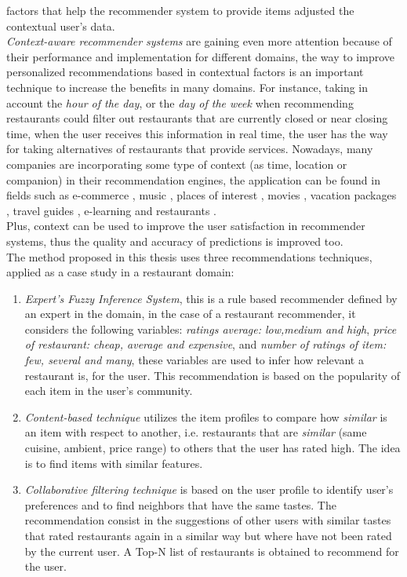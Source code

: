 factors that help the recommender system to provide items adjusted the
contextual user's data.\\
\textit{Context-aware recommender systems} are gaining even more
attention because of their performance and implementation for
different domains, the  way to improve personalized recommendations
based in contextual factors is an important technique to increase the
benefits in  many domains. For instance, taking in account the
\textit{hour of the day},  or the \textit{day of the week} when
recommending restaurants could  filter out restaurants that are
currently closed or near closing time, when the user receives this
information in real time, the user has the  way for taking
alternatives of restaurants that provide services. Nowadays, many
companies are incorporating some type of context (as time, location or
companion) in their recommendation engines, the application can be
found in fields such as e-commerce \cite{schafer1999recommender}
 \cite{bulander2005enabling}, music \cite{ricci2012context}
 \cite{baltrunas2011incarmusic}  \cite{huq2010automated}, places of
interest \cite{baltrunas2012context},
movies \cite{eyjolfsdottir2010moviegen}, vacation
packages \cite{liu2011personalized}  \cite{liu2014cocktail},  travel
guides \cite{savage2012m}, e-learning \cite{ortigosa2010entornos}  and
restaurants \cite{chu2013chinese}.\\
Plus, context can be used to improve the user satisfaction  in
recommender systems, thus the quality and accuracy of predictions  
is improved too. \\
The method proposed in this thesis uses three recommendations techniques,
applied as a case study in a restaurant domain:
\begin{enumerate} 
\item \textit{Expert's Fuzzy Inference System}, this is a rule based 
recommender defined by an expert in the domain, in the case of 
a restaurant recommender, it considers the following
variables: \textit{ratings average: low,medium and high},
\textit{price of restaurant: cheap, average and expensive}, and
\textit{number of ratings of item: few, several and many}, these
variables are used to infer how relevant a restaurant is, for the user.
This recommendation is based on the popularity of each item in the
user's community.
\item \textit{Content-based technique} utilizes the item profiles 
to compare how \textit{similar} is an item with respect to 
another, i.e. restaurants that are \textit{similar} (same cuisine, 
ambient, price range) to others that the user has rated high. 
The idea is to find items with similar features. 
\item \textit{Collaborative filtering technique} is based on the user
profile to identify user's preferences and to find neighbors that
have the same tastes. The recommendation consist in the suggestions of
other users with similar tastes that rated restaurants again in a
similar way but where have not been rated by the current user. A Top-N
list of restaurants is obtained to recommend for the user.
\end{enumerate} 
